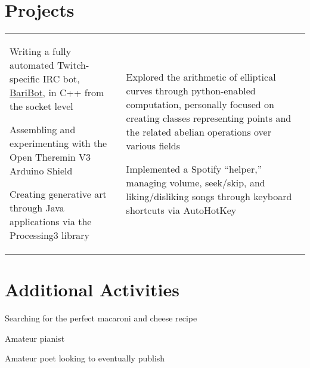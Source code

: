 \documentclass[10.5pt, letterpaper]{article}
\begin{document}
\section*{Projects}

\begin{center}
	\begin{tabularx}{\textwidth}{X X}
		\begin{description}
			\item [Current Projects] 
				Writing a fully automated Twitch-specific IRC bot, \href{https://github.com/Baricus/BariBot}{BariBot}, in C++ from the socket level
			\item Assembling and experimenting with the Open Theremin V3 Arduino Shield
			\item Creating generative art through Java applications via the Processing3 library
		\end{description}

		&
		\begin{description}
			\item [Prior Projects] 
				Explored the arithmetic of elliptical curves through python-enabled computation, personally focused on creating classes representing points and the related abelian operations over various fields
			\item Implemented a Spotify ``helper,'' managing volume, seek/skip, and liking/disliking songs through keyboard shortcuts via AutoHotKey
		\end{description}	
	\end{tabularx}
\end{center}

\section*{Additional Activities}

\begin{center}
	\begin{multicols}{2}
		\begin{description}
			
			\item Searching for the perfect macaroni and cheese recipe
			\item Amateur pianist
			\item Amateur poet looking to eventually publish
		\end{description}
	\end{multicols}
\end{center}
\end{document}
